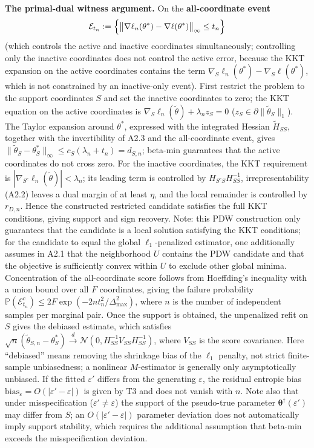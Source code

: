 \documentclass[11pt,a4paper]{article}
\theoremstyle{remark}
\begin{document}
\textbf{The primal-dual witness argument.} On the \textbf{all-coordinate event}
\begin{equation}\label{eq:full_event}
\mathcal{E}_{t_n}:=\Bigl\{\bigl\|\nabla\ell_n(\theta^*)-\nabla\ell(\theta^*)\bigr\|_\infty\le t_n\Bigr\}
\end{equation}
(which controls the active and inactive coordinates simultaneously; controlling only the
inactive coordinates does not control the active error, because the KKT expansion on the
active coordinates contains the term
$\nabla_S\ell_n(\theta^*)-\nabla_S\ell(\theta^*)$, which is not constrained by an
inactive-only event). First restrict the problem to the support coordinates $S$ and set the
inactive coordinates to zero; the KKT equation on the active coordinates is
$\nabla_S\ell_n(\widetilde\theta)+\lambda_n z_S=0$
($z_S\in\partial\|\widetilde\theta_S\|_1$). The Taylor expansion around $\theta^*$,
expressed with the integrated Hessian $\widetilde H_{SS}$, together with the invertibility
of A2.3 and the all-coordinate event, gives
$\|\widetilde\theta_S-\theta_S^*\|_\infty\le c_S(\lambda_n+t_n)=d_{S,n}$; beta-min
guarantees that the active coordinates do not cross zero. For the inactive coordinates, the
KKT requirement is $|\nabla_{S^c}\ell_n(\widetilde\theta)|<\lambda_n$; its leading term is
controlled by $H_{S^cS}H_{SS}^{-1}$, irrepresentability (A2.2) leaves a dual margin of at
least $\eta$, and the local remainder is controlled by $r_{D,n}$. Hence the constructed
restricted candidate satisfies the full KKT conditions, giving support and sign recovery.
Note: this PDW construction only guarantees that the candidate is a local solution
satisfying the KKT conditions; for the candidate to equal the global $\ell_1$-penalized
estimator, one additionally assumes in A2.1 that the neighborhood $U$ contains the PDW
candidate and that the objective is sufficiently convex within $U$ to exclude other global
minima. Concentration of the all-coordinate score follows from Hoeffding's inequality with
a union bound over all $F$ coordinates, giving the failure probability
$\mathbb{P}(\mathcal{E}_{t_n}^c)\le 2F\exp(-2nt_n^2/\Delta_{\max}^2)$, where $n$ is the
number of independent samples per marginal pair. Once the support is obtained, the
unpenalized refit on $S$ gives the debiased estimate, which satisfies
$\sqrt{n}(\widetilde\theta_{S,n}-\theta^*_S)\xrightarrow{d}\mathcal{N}(0,H_{SS}^{-1}V_{SS}H_{SS}^{-1})$,
where $V_{SS}$ is the score covariance. Here ``debiased'' means removing the shrinkage bias
of the $\ell_1$ penalty, not strict finite-sample unbiasedness; a nonlinear $M$-estimator
is generally only asymptotically unbiased. If the fitted $\varepsilon'$ differs from the
generating $\varepsilon$, the residual entropic bias
$\mathrm{bias}_\varepsilon=O(|\varepsilon'-\varepsilon|)$ is given by T3 and does not
vanish with $n$. Note also that under misspecification ($\varepsilon'\ne\varepsilon$) the
support of the pseudo-true parameter $\bm{\theta}^{\dagger}(\varepsilon')$ may differ from
$S$; an $O(|\varepsilon'-\varepsilon|)$ parameter deviation does not automatically imply
support stability, which requires the additional assumption that beta-min exceeds the
misspecification deviation.
\end{document}
